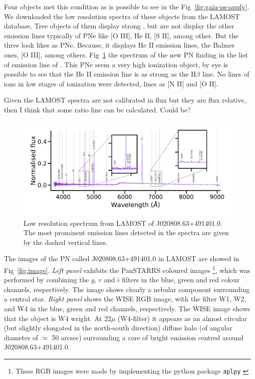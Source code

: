 \documentclass[fleqn,usenatbib]{mnras}
\begin{document}
Four objects met this  condition as is possible to see in the Fig~\ref{fig:gaia-ps-apply}.
We downloaded the low resolution spectra of these objects from the LAMOST database. 
Tree objects of them display strong \ha{}, but are not display the other emission
lines typically of PNe like [O III], He II, [S II], among other. But the three look likes as PNe.
Because, it displays He II emission lines, the Balmer ones, [O III], among others.
Fig~\ref{fig:spectra} the spectrum of the new PN finding in the list of emission line of
\citet{Skoda:2020}. This PNe seem a very high ionization object, by eye is possible to see
that the He II emission line is as strong as the H$\beta$ line. No lines of ions in low stages
of ionization were detected, lines as [N II] and [O II].


Given the LAMOST spectra are not calibrated in flux but they are flux relative,
then I think that some ratio line can be calculated. Could be?

\begin{figure}
\centering
  \includegraphics[width=\linewidth]{Figs/spec-56581-VB031N50V1_sp08-218.pdf}
  \caption{Low resolution spectrum from LAMOST of J020808.63+491401.0.
    The most prominent emission lines detected in the spectra are given by the dashed vertical
    lines.} 
  \label{fig:spectra}
\end{figure}

The images of the PN called J020808.63+491401.0 in LAMOST are showed
in Fig~\ref{fig:image}.
\textit{Left panel} exhibits the PanSTARRS coloured
images \footnote{These RGB images were made by implementing
the python package \texttt{aplpy} \citep{aplpy:2019}}, which
was performed by combining the $g$, $r$ and $i$ filters in
the blue, green and red colour channels, respectively.
The image shows clearly a nebular component surrounding 
a central star. \textit{Right panel} shows the
WISE RGB image, with the filter W1, W2, and W4 in
the blue, green and red channels, respectively.
 The WISE image shows that the object is W4 wright.  
At 22$\mu$ (W4-filter) it appears as an almost
circular (but slightly elongated in the north-south direction)
diffuse halo (of angular diameter of $\simeq$ 50 arcsec) surrounding
a core of bright emission centred around J020808.63+491401.0. 
\end{document}
